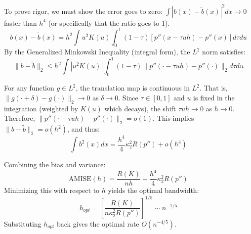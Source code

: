 To prove rigor, we must show the error goes to zero: $\int |b(x) - \tilde{b}(x)|^2 dx \to 0$ faster than $h^4$ (or specifically that the ratio goes to 1).
$$ b(x) - \tilde{b}(x) = h^2 \int u^2 K(u) \int_0^1 (1-\tau) [p''(x - \tau u h) - p''(x)] d\tau du $$
By the Generalized Minkowski Inequality (integral form), the $L^2$ norm satisfies:
$$ \|b - \tilde{b}\|_2 \le h^2 \int |u^2 K(u)| \int_0^1 (1-\tau) \|p''(\cdot - \tau u h) - p''(\cdot)\|_2 d\tau du $$

For any function $g \in L^2$, the translation map is continuous in $L^2$. That is, $\|g(\cdot + \delta) - g(\cdot)\|_2 \to 0$ as $\delta \to 0$.
Since $\tau \in [0,1]$ and $u$ is fixed in the integration (weighted by $K(u)$ which decays), the shift $\tau u h \to 0$ as $h \to 0$.
Therefore, $\|p''(\cdot - \tau u h) - p''(\cdot)\|_2 = o(1)$.
This implies $\|b - \tilde{b}\|_2 = o(h^2)$, and thus:
$$ \int b^2(x) dx = \frac{h^4}{4} \kappa_2^2 R(p'') + o(h^4) $$

Combining the bias and variance:
$$ \text{AMISE}(h) = \frac{R(K)}{nh} + \frac{h^4}{4} \kappa_2^2 R(p'') $$
Minimizing this with respect to $h$ yields the optimal bandwidth:
$$ h_{opt} = \left[ \frac{R(K)}{n \kappa_2^2 R(p'')} \right]^{1/5} \sim n^{-1/5} $$
Substituting $h_{opt}$ back gives the optimal rate $O(n^{-4/5})$.


